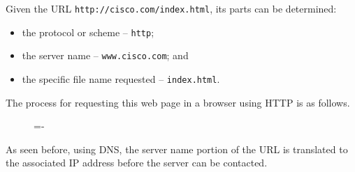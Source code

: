 \documentclass[a4paper]{systems-software}
\begin{document}
Given the URL \texttt{http://cisco.com/index.html}, its parts can be determined:
\begin{itemize}
	\item the protocol or scheme -- \texttt{http};
	\item the server name -- \texttt{www.cisco.com}; and
	\item the specific file name requested -- \texttt{index.html}.
\end{itemize}

The process for requesting this web page in a browser using HTTP is as follows.

\begin{figure}[H]
	\lineskip=-\fboxrule
\end{figure}

As seen before, using DNS, the server name portion of the URL is translated to the associated IP address before the server can be contacted.
\end{document}
